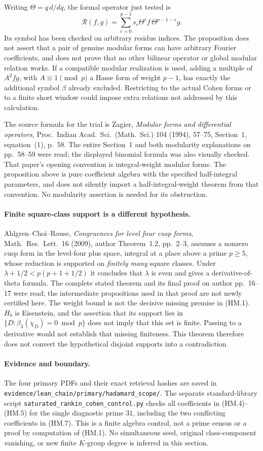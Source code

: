Writing $\Theta=q\,d/dq$, the formal operator just tested is
\[
 \mathcal R(f,g)=\sum_{r=0}^{p-1}s_r
          \Theta^rf\,\Theta^{p-1-r}g.
 \tag{HM.8}
\]
Its symbol has been checked on arbitrary residue indices.  The proposition
does not assert that a pair of genuine modular forms can have arbitrary
Fourier coefficients, and does not prove that no other bilinear operator
or global modular relation works.  If a compatible modular realization
is used, adding a multiple of $A^2fg$, with $A\equiv1\pmod p$ a Hasse
form of weight $p-1$, has exactly the additional symbol $\beta$ already
excluded.  Restricting to the actual Cohen forms or to a finite short
window could impose extra relations not addressed by this calculation.

The source formula for the trial is Zagier, \emph{Modular forms and
differential operators}, Proc.\ Indian Acad.\ Sci.\ (Math.\ Sci.)
104 (1994), 57--75, Section~1, equation~(1), p.~58.  The entire Section~1
and both modularity explanations on pp.~58--59 were read; the displayed
binomial formula was also visually checked.  That paper's opening
convention is integral-weight modular forms.  The proposition above is
pure coefficient algebra with the specified half-integral parameters,
and does not silently import a half-integral-weight theorem from that
convention.  No modularity assertion is needed for its obstruction.

\paragraph{Finite square-class support is a different hypothesis.}
Ahlgren--Choi--Rouse, \emph{Congruences for level four cusp forms},
Math.\ Res.\ Lett.\ 16 (2009), author Theorem~1.2, pp.~2--3, assumes a
nonzero cusp form in the level-four plus space, integral at a place
above a prime $p\ge5$, whose reduction is supported on \emph{finitely
many} square classes.  Under
$\lambda+1/2<p(p+1+1/2)$ it concludes that $\lambda$ is even and gives
a derivative-of-theta formula.  The complete stated theorem and its
final proof on author pp.~16--17 were read; the intermediate
propositions used in that proof are not newly certified here.
The weight bound is not the decisive missing premise in (HM.1).
$H_b$ is Eisenstein, and the assertion that its support lies in
$\{D:\beta_3(\chi_D)=0\bmod p\}$ does not imply that this set is finite.
Passing to a derivative would not establish that missing finiteness.
This theorem therefore does not convert the hypothetical disjoint
supports into a contradiction.

\paragraph{Evidence and boundary.}
The four primary PDFs and their exact retrieval hashes are saved in
\texttt{evidence/lean\_chain/primary/hadamard\_scope/}.
The separate standard-library script
\texttt{saturated\_rankin\_cohen\_control.py} checks all coefficients
in (HM.4)--(HM.5) for the single diagnostic prime $31$, including the
two conflicting coefficients in (HM.7).  This is a finite algebra
control, not a prime census or a proof by computation of (HM.1).
No simultaneous seed, original class-component vanishing, or new
finite $K$-group degree is inferred in this section.
